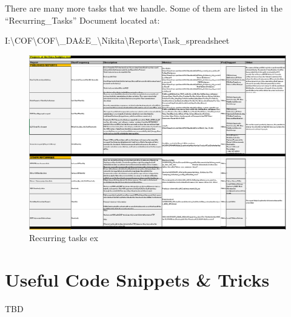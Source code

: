 \documentclass[
]{book}
\newenvironment{Shaded}{\begin{snugshade}}{\end{snugshade}}
\newcommand{\NormalTok}[1]{#1}
\newcommand{\SpecialCharTok}[1]{\textcolor[rgb]{0.00,0.00,0.00}{#1}}
\begin{document}
There are many more tasks that we handle. Some of them are listed in the ``Recurring\_Tasks'' Document located at:

\begin{Shaded}
\begin{Highlighting}[]
\NormalTok{I}\SpecialCharTok{:}\NormalTok{\textbackslash{}COF\textbackslash{}COF\textbackslash{}\_DA}\SpecialCharTok{\&}\NormalTok{E\_\textbackslash{}Nikita\textbackslash{}Reports\textbackslash{}Task\_spreadsheet}
\end{Highlighting}
\end{Shaded}

\begin{figure}
\centering
\includegraphics{my_files/recurring_tasks.png}
\caption{Recurring tasks ex}
\end{figure}

\hypertarget{useful-code-snippets-tricks}{%
\chapter{Useful Code Snippets \& Tricks}\label{useful-code-snippets-tricks}}

TBD

  
\end{document}
